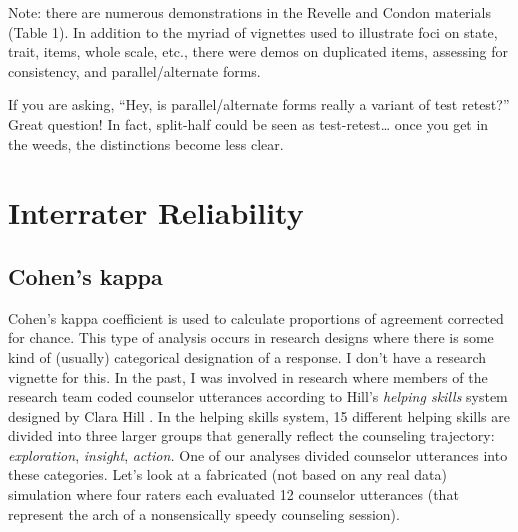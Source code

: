 \documentclass[
  english,
]{book}
\begin{document}
Note: there are numerous demonstrations in the Revelle and Condon \citetext{\citeyear{revelle_reliability_2019}; \citeyear{revelle_reliability_2019-1}} materials (Table 1). In addition to the myriad of vignettes used to illustrate foci on state, trait, items, whole scale, etc., there were demos on duplicated items, assessing for consistency, and parallel/alternate forms.

If you are asking, ``Hey, is parallel/alternate forms really a variant of test retest?'' Great question! In fact, split-half could be seen as test-retest\ldots{} once you get in the weeds, the distinctions become less clear.

\hypertarget{interrater-reliability}{%
\section{Interrater Reliability}\label{interrater-reliability}}

\hypertarget{cohens-kappa}{%
\subsection{Cohen's kappa}\label{cohens-kappa}}

Cohen's kappa coefficient is used to calculate proportions of agreement corrected for chance. This type of analysis occurs in research designs where there is some kind of (usually) categorical designation of a response. I don't have a research vignette for this. In the past, I was involved in research where members of the research team coded counselor utterances according to Hill's \emph{helping skills} system designed by Clara Hill \citep{hill_helping_2020}. In the helping skills system, 15 different helping skills are divided into three larger groups that generally reflect the counseling trajectory: \emph{exploration}, \emph{insight}, \emph{action.} One of our analyses divided counselor utterances into these categories. Let's look at a fabricated (not based on any real data) simulation where four raters each evaluated 12 counselor utterances (that represent the arch of a nonsensically speedy counseling session).
\end{document}
